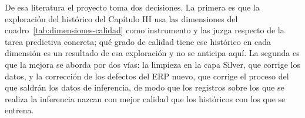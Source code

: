 De esa literatura el proyecto toma dos decisiones. La primera es que la exploración del histórico del Capítulo III usa las dimensiones del cuadro~\ref{tab:dimensiones-calidad} como instrumento y las juzga respecto de la tarea predictiva concreta; qué grado de calidad tiene ese histórico en cada dimensión es un resultado de esa exploración y no se anticipa aquí. La segunda es que la mejora se aborda por dos vías: la limpieza en la capa Silver, que corrige los datos, y la corrección de los defectos del ERP nuevo, que corrige el proceso del que saldrán los datos de inferencia, de modo que los registros sobre los que se realiza la inferencia nazcan con mejor calidad que los históricos con los que se entrena.
